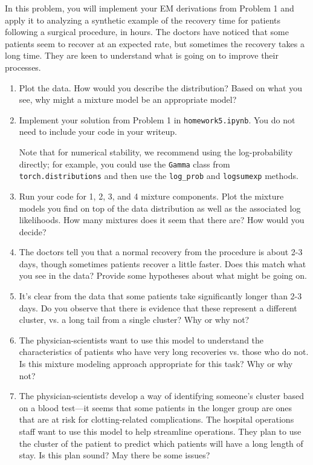\documentclass[submit]{../harvardml}
\begin{document}
\begin{problem}
  In this problem, you will implement your EM derivations from Problem
  1 and apply it to analyzing a synthetic example of the recovery time
  for patients following a surgical procedure, in hours.  The doctors
  have noticed that some patients seem to recover at an expected rate,
  but sometimes the recovery takes a long time.  They are keen to
  understand what is going on to improve their processes.  

  \begin{enumerate}
    \item Plot the data.  How would you describe the distribution?
    Based on what you see, why might a mixture model be an appropriate
    model?  
      
    \item Implement your solution from Problem 1 in \texttt{homework5.ipynb}. You do not need to include your code in your writeup.

    Note that for numerical stability, we recommend using the 
    log-probability directly; for example, you could use the \texttt{Gamma} class from \texttt{torch.distributions} and then use the \texttt{log\_prob} and \texttt{logsumexp} methods.

    \item Run your code for 1, 2, 3, and 4 mixture components.  Plot the
    mixture models you find on top of the data distribution as well as
    the associated log likelihoods.  How many mixtures does it seem that
    there are?  How would you decide?
  
    \item The doctors tell you that a normal recovery from the procedure
    is about 2-3 days, though sometimes patients recover a little
    faster.  Does this match what you see in the data?  Provide some
    hypotheses about what might be going on.

    \item It's clear from the data that some patients take significantly
    longer than 2-3 days.  Do you observe that there is evidence that
    these represent a different cluster, vs. a long tail from a single
    cluster?  Why or why not?

    \item The physician-scientists want to use this model to understand
    the characteristics of patients who have very long recoveries
    vs. those who do not.  Is this mixture modeling approach appropriate
    for this task?  Why or why not?

    \item The physician-scientists develop a way of identifying someone's
    cluster based on a blood test---it seems that some patients in the
    longer group are ones that are at risk for clotting-related
    complications.  The hospital operations staff want to use this model
    to help streamline operations.  They plan to use the cluster of the
    patient to predict which patients will have a long length of stay.
    Is this plan sound?  May there be some issues?
  \end{enumerate} 
\end{problem}
\end{document}
